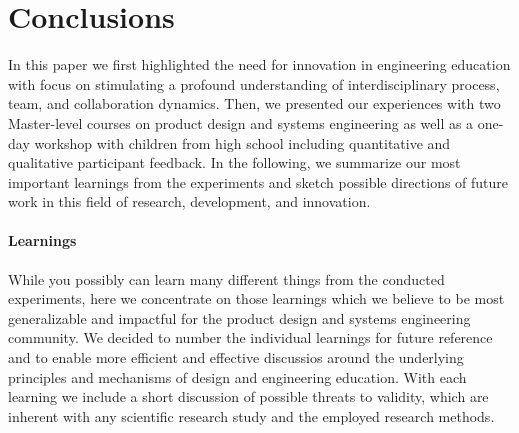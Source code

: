 \documentclass{PDS}
\begin{document}
\section{Conclusions}
\label{sec:conclusion}

In this paper we first highlighted the need for innovation in engineering education with focus on stimulating a profound understanding of interdisciplinary process, team, and collaboration dynamics.
Then, we presented our experiences with two Master-level courses on product design and systems engineering as well as a one-day workshop with children from high school including quantitative and qualitative participant feedback.
In the following, we summarize our most important learnings from the experiments and sketch possible directions of future work in this field of research, development, and innovation.

\paragraph{Learnings}

While you possibly can learn many different things from the conducted experiments, here we concentrate on those learnings which we believe to be most generalizable and impactful for the product design and systems engineering community.
We decided to number the individual learnings for future reference and to enable more efficient and effective discussios around the underlying principles and mechanisms of design and engineering education.
With each learning we include a short discussion of possible threats to validity, which are inherent with any scientific research study and the employed research methods.
\end{document}
